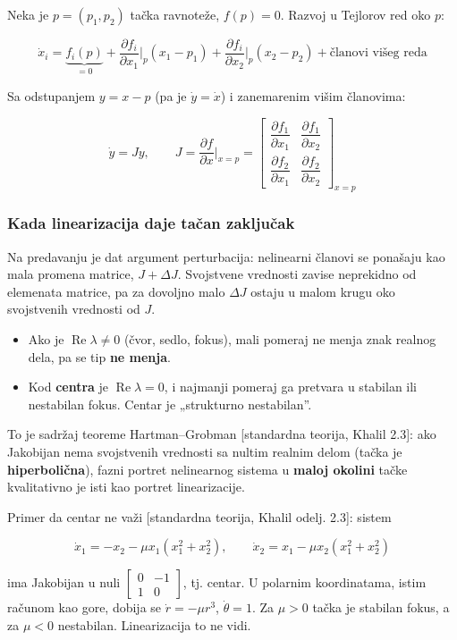 \documentclass[11pt,a4paper,parskip=half,headsepline,numbers=noenddot]{scrartcl}
\DeclareRobustCommand{\izvor}[1]{{\small\color{izvorC}[#1]}}
\begin{document}
Neka je \(p = (p_1, p_2)\) tačka ravnoteže, \(f(p) = 0\). Razvoj u Tejlorov red oko \(p\):

\[\dot x_i = \underbrace{f_i(p)}_{=0} + \frac{\partial f_i}{\partial x_1}\Big|_p (x_1 - p_1) + \frac{\partial f_i}{\partial x_2}\Big|_p (x_2 - p_2) + \text{članovi višeg reda}\]

Sa odstupanjem \(y = x - p\) (pa je \(\dot y = \dot x\)) i zanemarenim višim članovima:

\[\dot y = Jy, \qquad J = \frac{\partial f}{\partial x}\Big|_{x = p} = \begin{bmatrix} \dfrac{\partial f_1}{\partial x_1} & \dfrac{\partial f_1}{\partial x_2} \\ \dfrac{\partial f_2}{\partial x_1} & \dfrac{\partial f_2}{\partial x_2} \end{bmatrix}_{x = p}\]

\subsubsection{Kada linearizacija daje tačan zaključak}

Na predavanju je dat argument perturbacija: nelinearni članovi se ponašaju kao mala promena matrice, \(J + \Delta J\). Svojstvene vrednosti zavise neprekidno od elemenata matrice, pa za dovoljno malo \(\Delta J\) ostaju u malom krugu oko svojstvenih vrednosti od \(J\).

\begin{itemize}
\item Ako je \(\operatorname{Re}\lambda \ne 0\) (čvor, sedlo, fokus), mali pomeraj ne menja znak realnog dela, pa se tip \textbf{ne menja}.
\item Kod \textbf{centra} je \(\operatorname{Re}\lambda = 0\), i najmanji pomeraj ga pretvara u stabilan ili nestabilan fokus. Centar je „strukturno nestabilan''.
\end{itemize}

To je sadržaj teoreme Hartman--Grobman \izvor{standardna teorija, Khalil 2.3}: ako Jakobijan nema svojstvenih vrednosti sa nultim realnim delom (tačka je \textbf{hiperbolična}), fazni portret nelinearnog sistema u \textbf{maloj okolini} tačke kvalitativno je isti kao portret linearizacije.

Primer da centar ne važi \izvor{standardna teorija, Khalil odelj. 2.3}: sistem

\[\dot x_1 = -x_2 - \mu x_1(x_1^2 + x_2^2), \qquad \dot x_2 = x_1 - \mu x_2(x_1^2 + x_2^2)\]

ima Jakobijan u nuli \(\begin{bmatrix}0 & -1\\ 1 & 0\end{bmatrix}\), tj. centar. U polarnim koordinatama, istim računom kao gore, dobija se \(\dot r = -\mu r^3\), \(\dot\theta = 1\). Za \(\mu > 0\) tačka je stabilan fokus, a za \(\mu < 0\) nestabilan. Linearizacija to ne vidi.
\end{document}
